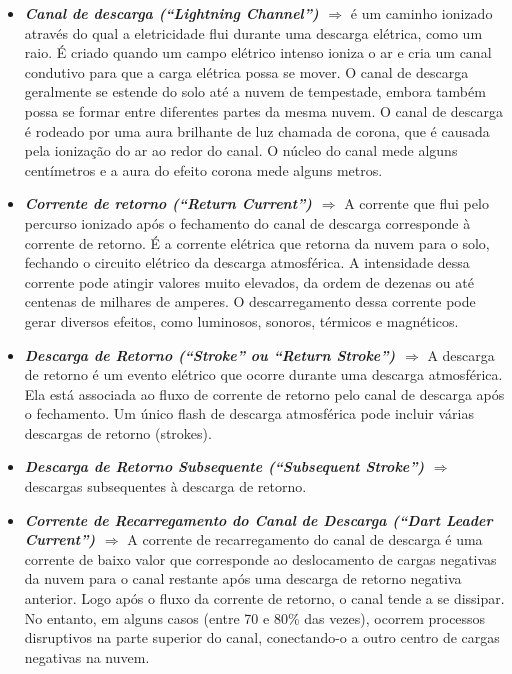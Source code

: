 \documentclass[a4paper, 12pt, onecolumn,singlespacing]{article}
\begin{document}
\begin{itemize}
		\item \textbf{\textit{Canal de descarga (``Lightning Channel'') $\Rightarrow$ }}é um caminho ionizado através do qual a eletricidade flui durante uma descarga elétrica, como um raio. É criado quando um campo elétrico intenso ioniza o ar e cria um canal condutivo para que a carga elétrica possa se mover. O canal de descarga geralmente se estende do solo até a nuvem de tempestade, embora também possa se formar entre diferentes partes da mesma nuvem. O canal de descarga é rodeado por uma aura brilhante de luz chamada de corona, que é causada pela ionização do ar ao redor do canal. O núcleo do canal mede alguns centímetros e a aura do efeito corona mede alguns metros.
		
		\item \textbf{\textit{Corrente de retorno (``Return Current'') $\Rightarrow$ }}A corrente que flui pelo percurso ionizado após o fechamento do canal de descarga corresponde à corrente de retorno. É a corrente elétrica que retorna da nuvem para o solo, fechando o circuito elétrico da descarga atmosférica. A intensidade dessa corrente pode atingir valores muito elevados, da ordem de dezenas ou até centenas de milhares de amperes. O descarregamento dessa corrente pode gerar diversos efeitos, como luminosos, sonoros, térmicos e magnéticos.
		
		\item \textbf{\textit{Descarga de Retorno (``Stroke'' ou ``Return Stroke'') $\Rightarrow$ }}A descarga de retorno é um evento elétrico que ocorre durante uma descarga atmosférica. Ela está associada ao fluxo de corrente de retorno pelo canal de descarga após o fechamento. Um único flash de descarga atmosférica pode incluir várias descargas de retorno (strokes).
		
		\item \textbf{\textit{Descarga de Retorno Subsequente (``Subsequent Stroke'') $\Rightarrow$ }} descargas subsequentes à descarga de retorno.
		
		\item \textbf{\textit{Corrente de Recarregamento do Canal de Descarga (``Dart Leader Current'') $\Rightarrow$ }} A corrente de recarregamento do canal de descarga é uma corrente de baixo valor que corresponde ao deslocamento de cargas negativas da nuvem para o canal restante após uma descarga de retorno negativa anterior. Logo após o fluxo da corrente de retorno, o canal tende a se dissipar. No entanto, em alguns casos (entre 70 e 80\% das vezes), ocorrem processos disruptivos na parte superior do canal, conectando-o a outro centro de cargas negativas na nuvem.
		

\end{itemize}
\end{document}
